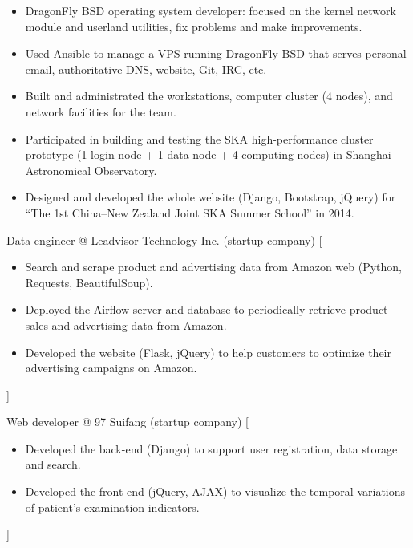 \documentclass{resume}
\begin{document}
\begin{itemize}
  \item DragonFly BSD operating system developer:
    focused on the kernel network module and userland utilities,
    fix problems and make improvements.
  \item Used Ansible to manage a VPS running DragonFly BSD that serves
    personal email, authoritative DNS, website, Git, IRC, etc.
  \item Built and administrated the workstations, computer cluster
    (4 nodes), and network facilities for the team.
  \item Participated in building and testing the SKA high-performance
    cluster prototype (1 login node + 1 data node + 4 computing nodes)
    in Shanghai Astronomical Observatory.
  \item Designed and developed the whole website (Django, Bootstrap, jQuery)
    for \enquote{The 1st China--New Zealand Joint SKA Summer School}
    in 2014.
\end{itemize}

\begin{experiences}
    {Data engineer @ Leadvisor Technology Inc. (startup company)}%
    [\begin{itemize}
      \item Search and scrape product and advertising data from Amazon web
        (Python, Requests, BeautifulSoup).
      \item Deployed the Airflow server and database to periodically
        retrieve product sales and advertising data from Amazon.
      \item Developed the website (Flask, jQuery) to help customers to
        optimize their advertising campaigns on Amazon.
    \end{itemize}]%

  \separator{0.5em}
    {Web developer @ 97 Suifang (startup company)}%
    [\begin{itemize}
      \item Developed the back-end (Django) to support user registration,
        data storage and search.
      \item Developed the front-end (jQuery, AJAX) to visualize the
        temporal variations of patient's examination indicators.
    \end{itemize}]%
\end{experiences}
\end{document}
